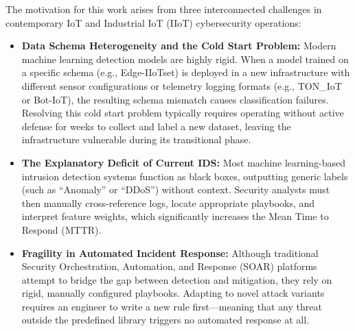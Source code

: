 \documentclass[conference]{IEEEtran}
\begin{document}
The motivation for this work arises from three interconnected challenges in contemporary IoT and Industrial IoT (IIoT) cybersecurity operations:
\begin{itemize}
    \item \textbf{Data Schema Heterogeneity and the Cold Start Problem:} Modern machine learning detection models are highly rigid. When a model trained on a specific schema (e.g., Edge-IIoTset) is deployed in a new infrastructure with different sensor configurations or telemetry logging formats (e.g., TON\_IoT or Bot-IoT), the resulting schema mismatch causes classification failures. Resolving this cold start problem typically requires operating without active defense for weeks to collect and label a new dataset, leaving the infrastructure vulnerable during its transitional phase.
    \item \textbf{The Explanatory Deficit of Current IDS:} Most machine learning-based intrusion detection systems function as black boxes, outputting generic labels (such as ``Anomaly'' or ``DDoS'') without context. Security analysts must then manually cross-reference logs, locate appropriate playbooks, and interpret feature weights, which significantly increases the Mean Time to Respond (MTTR).
    \item \textbf{Fragility in Automated Incident Response:} Although traditional Security Orchestration, Automation, and Response (SOAR) platforms attempt to bridge the gap between detection and mitigation, they rely on rigid, manually configured playbooks. Adapting to novel attack variants requires an engineer to write a new rule first---meaning that any threat outside the predefined library triggers no automated response at all.
\end{itemize}
\end{document}
